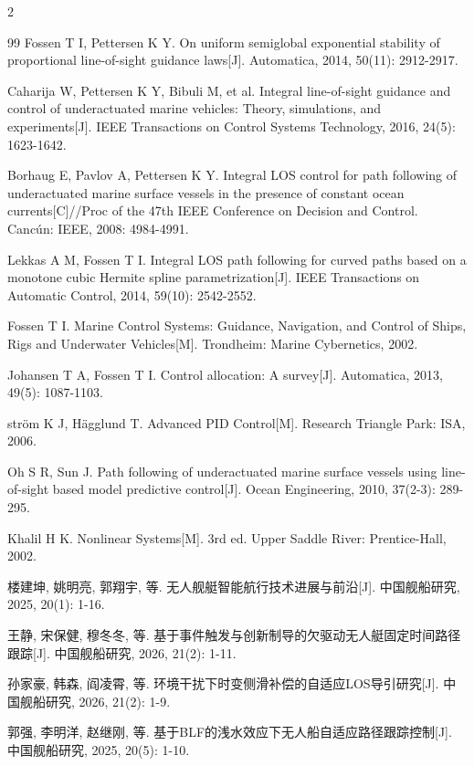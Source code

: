 \documentclass[authordraft]{ctacn}
\begin{document}
\begin{multicols}{2}
\begin{thebibliography}{99}
Fossen T I, Pettersen K Y. On uniform semiglobal exponential stability of proportional line-of-sight guidance laws[J]. Automatica, 2014, 50(11): 2912-2917.

Caharija W, Pettersen K Y, Bibuli M, et al. Integral line-of-sight guidance and control of underactuated marine vehicles: Theory, simulations, and experiments[J]. IEEE Transactions on Control Systems Technology, 2016, 24(5): 1623-1642.

Borhaug E, Pavlov A, Pettersen K Y. Integral LOS control for path following of underactuated marine surface vessels in the presence of constant ocean currents[C]//Proc of the 47th IEEE Conference on Decision and Control. Canc\'{u}n: IEEE, 2008: 4984-4991.

Lekkas A M, Fossen T I. Integral LOS path following for curved paths based on a monotone cubic Hermite spline parametrization[J]. IEEE Transactions on Automatic Control, 2014, 59(10): 2542-2552.

Fossen T I. Marine Control Systems: Guidance, Navigation, and Control of Ships, Rigs and Underwater Vehicles[M]. Trondheim: Marine Cybernetics, 2002.

Johansen T A, Fossen T I. Control allocation: A survey[J]. Automatica, 2013, 49(5): 1087-1103.

str{\"o}m K J, H{\"a}gglund T. Advanced PID Control[M]. Research Triangle Park: ISA, 2006.

Oh S R, Sun J. Path following of underactuated marine surface vessels using line-of-sight based model predictive control[J]. Ocean Engineering, 2010, 37(2-3): 289-295.

Khalil H K. Nonlinear Systems[M]. 3rd ed. Upper Saddle River: Prentice-Hall, 2002.

楼建坤, 姚明亮, 郭翔宇, 等. 无人舰艇智能航行技术进展与前沿[J]. 中国舰船研究, 2025, 20(1): 1-16.

王静, 宋保健, 穆冬冬, 等. 基于事件触发与创新制导的欠驱动无人艇固定时间路径跟踪[J]. 中国舰船研究, 2026, 21(2): 1-11.

孙家豪, 韩森, 阎凌霄, 等. 环境干扰下时变侧滑补偿的自适应LOS导引研究[J]. 中国舰船研究, 2026, 21(2): 1-9.

郭强, 李明洋, 赵继刚, 等. 基于BLF的浅水效应下无人船自适应路径跟踪控制[J]. 中国舰船研究, 2025, 20(5): 1-10.


\end{thebibliography}
\end{multicols}
\end{document}
